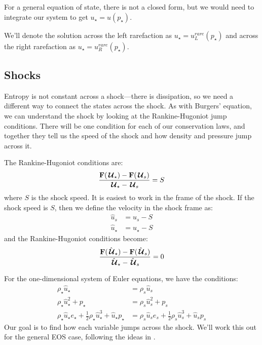 For a general equation of state, there is not a closed form, but we would need
to integrate our system to get $u_\star = u(p_\star)$.

We'll denote the solution across the left rarefaction as $u_\star =
u_L^{rare}(p_\star)$ and across the right rarefaction as $u_\star =
u_R^{rare}(p_\star)$.

\subsection{Shocks}

Entropy is not constant across a shock---there is dissipation, so we
need a different way to connect the states across the shock.  As with
Burgers' equation, we can understand the shock by looking at the
Rankine-Hugoniot jump conditions.  There will be one condition for
each of our conservation laws, and together they tell us the speed of
the shock and how density and pressure jump across
it.  

The Rankine-Hugoniot conditions are:
\begin{equation}
\frac{{\bf F}({\,\boldsymbol{\mathcal{U}}}_\star) - {\bf F}({\,\boldsymbol{\mathcal{U}}}_s)}{{\,\boldsymbol{\mathcal{U}}}_\star - {\,\boldsymbol{\mathcal{U}}}_s} = S
\end{equation}
where $S$ is the shock speed.  It is easiest to work in the frame of the shock.  If the shock speed
is $S$, then we define the velocity in the shock frame as:
\begin{align}
\hat{u}_s &= u_s - S  \\
\hat{u}_\star &= u_\star - S
\end{align}
and the Rankine-Hugoniot conditions become:
\begin{equation}
\frac{{\bf F}(\hat{{\,\boldsymbol{\mathcal{U}}}}_\star) - {\bf F}(\hat{{\,\boldsymbol{\mathcal{U}}}}_s)}{\hat{{\,\boldsymbol{\mathcal{U}}}}_\star - \hat{{\,\boldsymbol{\mathcal{U}}}}_s} = 0
\end{equation}

For the one-dimensional system of Euler equations, we have the conditions:
\begin{align}
\rho_\star \hat{u}_\star &= \rho_s \hat{u}_s \\
\rho_\star \hat{u}_\star^2 + p_\star &= \rho_s \hat{u}_s^2 + p_s \\
\rho_\star \hat{u}_\star e_\star + \frac{1}{2} \rho_\star \hat{u}_\star^3 + \hat{u}_\star p_\star &= 
  \rho_s \hat{u}_s e_s + \frac{1}{2} \rho_s \hat{u}_s^3 + \hat{u}_s p_s
\end{align}
Our goal is to find how each variable jumps across the shock.  We'll 
work this out for the general EOS case, following the ideas in \cite{colellaglaz:1985}.

